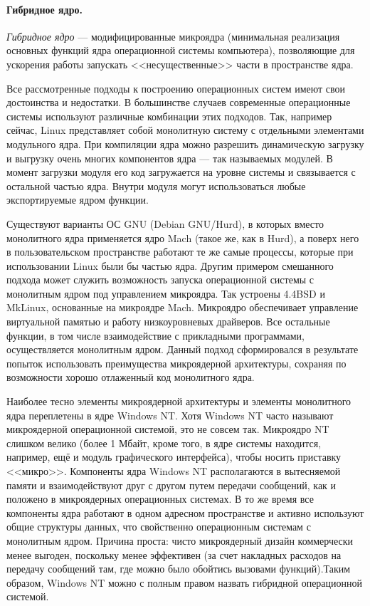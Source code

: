 \paragraph{Гибридное ядро.} \emph{Гибридное ядро} --- модифицированные микроядра (минимальная реализация основных функций ядра операционной системы компьютера), позволяющие для ускорения работы запускать <<несущественные>> части в пространстве ядра.

Все рассмотренные подходы к построению операционных систем имеют свои достоинства и недостатки. В большинстве случаев современные операционные системы используют различные комбинации этих подходов. 
Так, например сейчас, Linux представляет собой монолитную систему с отдельными элементами модульного ядра. При компиляции ядра можно разрешить динамическую загрузку и выгрузку очень многих компонентов ядра --- так называемых модулей.
В момент загрузки модуля его код загружается на уровне системы и связывается с остальной частью ядра. Внутри модуля могут использоваться любые экспортируемые ядром функции.

Существуют варианты ОС GNU (Debian GNU/Hurd), в которых вместо монолитного ядра применяется ядро Mach (такое же, как в Hurd), а поверх него в пользовательском пространстве работают те же самые процессы, которые при использовании Linux были бы частью ядра.
Другим примером смешанного подхода может служить возможность запуска операционной системы с монолитным ядром под управлением микроядра. Так устроены 4.4BSD и MkLinux, основанные на микроядре Mach.
Микроядро обеспечивает управление виртуальной памятью и работу низкоуровневых драйверов. Все остальные функции, в том числе взаимодействие с прикладными программами, осуществляется монолитным ядром. Данный подход сформировался в результате попыток использовать преимущества микроядерной архитектуры, сохраняя по возможности хорошо отлаженный код монолитного ядра.

Наиболее тесно элементы микроядерной архитектуры и элементы монолитного ядра переплетены в ядре Windows NT. Хотя Windows NT часто называют микроядерной операционной системой, это не совсем так. 
Микроядро NT слишком велико (более 1 Мбайт, кроме того, в ядре системы находится, например, ещё и модуль графического интерфейса), чтобы носить приставку <<микро>>. Компоненты ядра Windows NT располагаются в вытесняемой памяти и взаимодействуют друг с другом путем передачи сообщений, как и положено в микроядерных операционных системах.
В то же время все компоненты ядра работают в одном адресном пространстве и активно используют общие структуры данных, что свойственно операционным системам с монолитным ядром. Причина проста: чисто микроядерный дизайн коммерчески менее выгоден, поскольку менее эффективен (за счет накладных расходов на передачу сообщений там, где можно было обойтись вызовами функций).Таким образом, Windows NT можно с полным правом назвать гибридной операционной системой.

